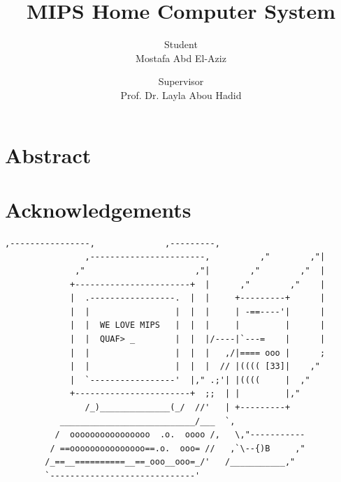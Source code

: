 \documentclass[oneside]{book}
\title{MIPS Home Computer System}
\author{
    \large Student\\
    \large Mostafa Abd El-Aziz\\
    \and
    \large Supervisor\\
    \large Prof. Dr. Layla Abou Hadid\\
}
\date{\vspace{-5ex}}
\begin{document}
\frontmatter


\makeititle


\newpage
\thispagestyle{plain}
\chapter{Abstract}


\newpage
\thispagestyle{plain}
\chapter{Acknowledgements}


\newpage
\thispagestyle{plain}
\vspace*{\fill}
\bfseries
\begin{Verbatim}[showspaces=false,fontsize=\small]
                     ,----------------,              ,---------,
                ,-----------------------,          ,"        ,"|
              ,"                      ,"|        ,"        ,"  |
             +-----------------------+  |      ,"        ,"    |
             |  .-----------------.  |  |     +---------+      |
             |  |                 |  |  |     | -==----'|      |
             |  |  WE LOVE MIPS   |  |  |     |         |      |
             |  |  QUAF> _        |  |  |/----|`---=    |      |
             |  |                 |  |  |   ,/|==== ooo |      ;
             |  |                 |  |  |  // |(((( [33]|    ,"
             |  `-----------------'  |," .;'| |((((     |  ,"
             +-----------------------+  ;;  | |         |,"
                /_)______________(_/  //'   | +---------+
           ___________________________/___  `,
          /  oooooooooooooooo  .o.  oooo /,   \,"-----------
         / ==ooooooooooooooo==.o.  ooo= //   ,`\--{)B     ,"
        /_==__==========__==_ooo__ooo=_/'   /___________,"
        `-----------------------------'
\end{Verbatim}
\normalfont
\vspace*{\fill}
\end{document}
